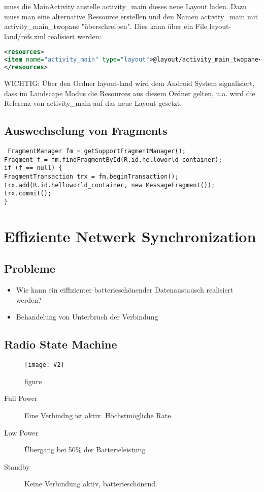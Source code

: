\documentclass[a4paper,10pt,titlepage=false]{scrreprt}
\newcommand{\pic}[2][figure]{\begin{figure}[h]
 \centering
 \texttt{[image: \#2]}
 \caption{#1}
\end{figure}
}
\begin{document}
\begin{enumerate}
muss die MainActivity anstelle activity\_main dieses neue Layout laden. Dazu muss man
eine alternative Ressource erstellen und den Namen activity\_main mit
activity\_main\_twopane "überschreiben". Dies kann über ein File layout-land/refs.xml
realisiert werden:
\begin{lstlisting}[language=xml]
<resources>
<item name="activity_main" type="layout">@layout/activity_main_twopane</item>
</resources>
\end{lstlisting}
WICHTIG: Über den Ordner layout-land wird dem Android System signalisiert, dass im
Landscape Modus die Resources aus diesem Ordner gelten, u.a. wird die Referenz von
activity\_main auf das neue Layout gesetzt.
\end{enumerate}

\section{Auswechselung von Fragments}
\begin{lstlisting}
 FragmentManager fm = getSupportFragmentManager();
Fragment f = fm.findFragmentById(R.id.helloworld_container);
if (f == null) {
FragmentTransaction trx = fm.beginTransaction();
trx.add(R.id.helloworld_container, new MessageFragment());
trx.commit();
}
\end{lstlisting}


\chapter{Effiziente Netwerk Synchronization}

\section{Probleme}
\begin{itemize}
 \item Wie kann ein eiffizienter batterieschönender Datenaustausch realisiert werden?
 \item Behandelung von Unterbruch der Verbindung
\end{itemize}

\section{Radio State Machine}
\pic{rsm.png}
\begin{description}
\item[Full Power] Eine Verbindng ist aktiv. Höchstmögliche Rate.
\item [Low Power] Übergang bei 50\% der Batterieleistung
\item[Standby] Keine Verbindung aktiv, batterieschönend.
\end{description}
\end{document}
